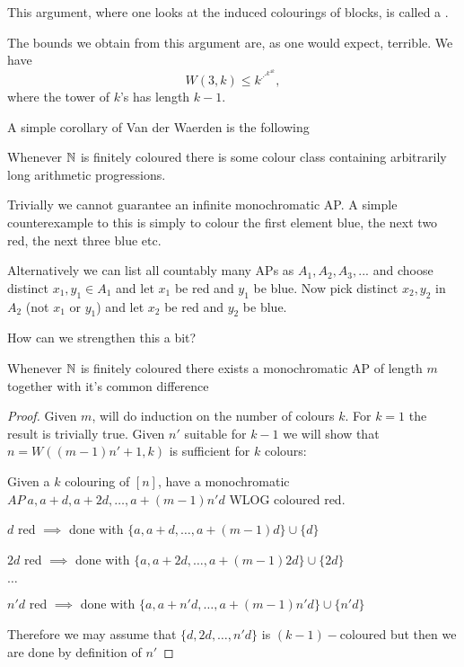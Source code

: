 \documentclass[a4paper]{article}
\begin{document}
This argument, where one looks at the induced colourings of blocks, is called a .

The bounds we obtain from this argument are, as one would expect, terrible. We have
\[
  W(3, k) \leq k^{\iddots^{k^{4k}}},
\]
where the tower of $k$'s has length $k - 1$.

A simple corollary of Van der Waerden is the following
\begin{cor}
  Whenever $\mathbb{N}$ is finitely coloured there is some colour class containing arbitrarily long arithmetic progressions.
\end{cor}

Trivially we cannot guarantee an infinite monochromatic AP. A simple counterexample to this is simply to colour the first element blue, the next two red, the next three blue etc.

Alternatively we can list all countably many APs as $A_1, A_2, A_3, ...$ and choose distinct $x_1, y_1 \in A_1$ and let $x_1$ be red and $y_1$ be blue. Now pick distinct $x_2, y_2$ in $A_2$ (not $x_1$ or $y_1$) and let $x_2$ be red and $y_2$ be blue.

How can we strengthen this a bit?

\begin{thm}
  Whenever $\mathbb{N}$ is finitely coloured there exists a monochromatic AP of length $m$ together with it's common difference
\end{thm}

\begin{proof}
  Given $m$, will do induction on the number of colours $k$. For $k = 1$ the result is trivially true. Given $n'$ suitable for $k-1$ we will show that $n = W((m-1)n' + 1, k)$ is sufficient for $k$ colours:
  
  Given a $k$ colouring of $[n]$, have a monochromatic $AP \ {a, a+d, a + 2d, \dots ,a + (m-1)n'd}$ WLOG coloured red.

  \begin{description}
  \item $d$ red $\implies$ done with $\{a, a+d, \dots, a+(m-1)d\} \cup \{d\}$
  \item $2d$ red $\implies$ done with $\{a, a+2d, \dots, a+(m-1)2d\} \cup \{2d\}$
  \item $\dots$
  \item $n'd$ red $\implies$ done with $\{a, a+n'd, \dots, a+(m-1)n'd\} \cup \{n'd\}$
  \end{description}
  Therefore we may assume that $\{d, 2d, \dots, n'd\}$ is $(k-1)-$coloured but then we are done by definition of $n'$
\end{proof}
\end{document}
